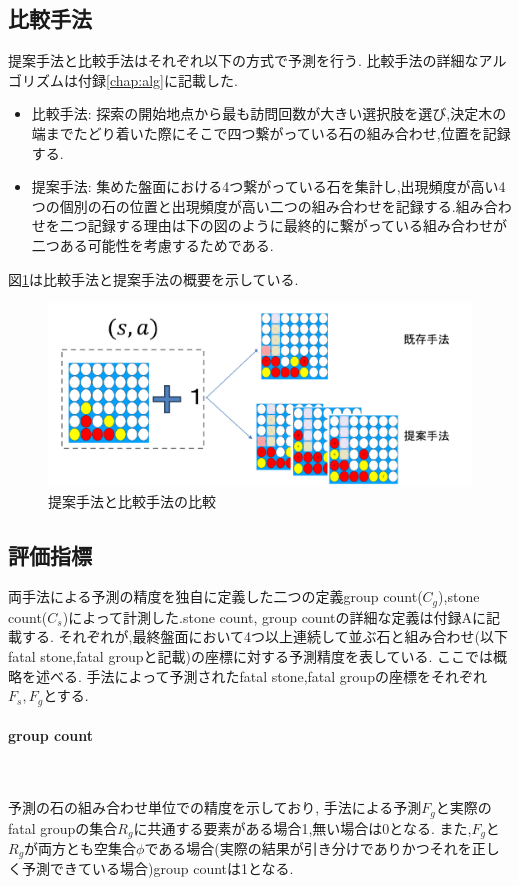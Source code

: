 \subsection{比較手法}
提案手法と比較手法はそれぞれ以下の方式で予測を行う.
比較手法の詳細なアルゴリズムは付録\ref{chap:alg}に記載した.
\newpage
\begin{itemize}
	\item 比較手法: 探索の開始地点から最も訪問回数が大きい選択肢を選び,決定木の端までたどり着いた際にそこで四つ繋がっている石の組み合わせ,位置を記録する.
	\item 提案手法: 集めた盤面における4つ繋がっている石を集計し,出現頻度が高い4つの個別の石の位置と出現頻度が高い二つの組み合わせを記録する.組み合わせを二つ記録する理由は下の図のように最終的に繋がっている組み合わせが二つある可能性を考慮するためである.
\end{itemize}
図\ref{fig:compare}は比較手法と提案手法の概要を示している.
\begin{figure}[t]
	\centering
	\includegraphics[width=\linewidth]{./figure/compare.pdf}
	\caption{提案手法と比較手法の比較}
	\label{fig:compare}
\end{figure}

\subsection{評価指標}
両手法による予測の精度を独自に定義した二つの定義group count($C_g$),stone count($C_s$)によって計測した.stone count, group countの詳細な定義は付録Aに記載する.
それぞれが,最終盤面において4つ以上連続して並ぶ石と組み合わせ(以下fatal stone,fatal groupと記載)の座標に対する予測精度を表している.
ここでは概略を述べる.
手法によって予測されたfatal stone,fatal groupの座標をそれぞれ$F_s, F_g$とする.

\paragraph{group count}~
\par 予測の石の組み合わせ単位での精度を示しており,
手法による予測$F_g$と実際のfatal groupの集合$R_g$に共通する要素がある場合1,無い場合は0となる.
また,$F_g$と$R_g$が両方とも空集合$\phi$である場合(実際の結果が引き分けでありかつそれを正しく予測できている場合)group countは1となる.
